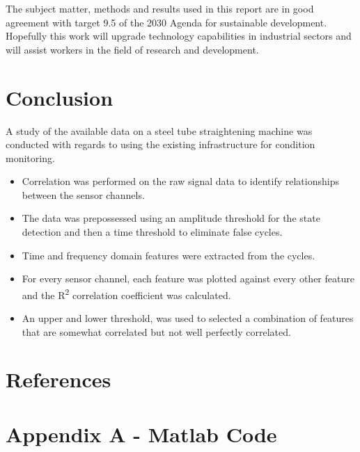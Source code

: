 \documentclass[]{article}
\begin{document}
The subject matter, methods and results used in this report are in good agreement with target 9.5 of the 2030 Agenda for sustainable development\cite{united2015department}. Hopefully this work will upgrade technology capabilities in industrial sectors and will assist workers in the field of research and development. 
\clearpage

\section{Conclusion}
A study of the available data on a steel tube straightening machine was conducted with regards to using the existing infrastructure for condition monitoring.
\begin{itemize}
\item Correlation was performed on the raw signal data to identify relationships between the sensor channels.
\item The data was prepossessed using an amplitude threshold for the state detection and then a time threshold to eliminate false cycles.
\item Time and frequency domain features were extracted from the cycles.
\item For every sensor channel, each feature was plotted against every other feature and the R\textsuperscript{2} correlation coefficient was calculated.
\item An upper and lower threshold, was used to selected a combination of features that are somewhat correlated but not well perfectly correlated.
\end{itemize}
\newpage

\section{References} 
\printbibliography[heading=none] 
\clearpage  
\section{Appendix A - Matlab Code}
\UseRawInputEncoding


%
\end{document}
